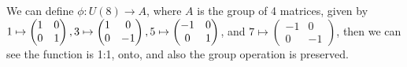 \noindent We can define $\phi: U(8) \rightarrow A$, where $A$ is the group of 4 matrices, given by  $1\mapsto \begin{pmatrix}1 & 0 \\ 0 & 1 \end{pmatrix}, 3 \mapsto \begin{pmatrix}1 & 0 \\0 & -1\end{pmatrix},
\\
5 \mapsto \begin{pmatrix}-1 & 0 \\0 & 1\end{pmatrix}$, and $7 \mapsto \begin{pmatrix}-1 & 0 \\0 & -1\end{pmatrix}$, then we can see the function is 1:1, onto, and also the group operation is preserved. 
\\
\\

